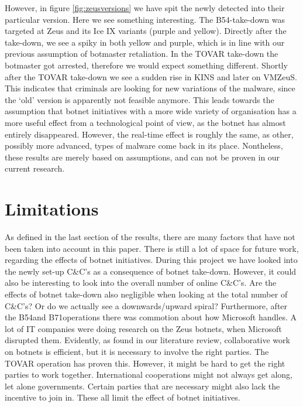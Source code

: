 \documentclass{sig-alternate-br}
\begin{document}
However, in figure \ref{fig:zeusversions} we have spit the newly detected into their particular version. Here we see something interesting. The B54-take-down was targeted at Zeus and its Ice IX variants (purple and yellow). Directly after the take-down, we see a spiky in both yellow and purple, which is in line with our previous assumption of botmaster retaliation. In the TOVAR take-down the botmaster got arrested, therefore we would expect something different. Shortly after the TOVAR take-down we see a sudden rise in KINS and later on VMZeuS. This indicates that criminals are looking for new variations of the malware, since the `old' version is apparently not feasible anymore. This leads towards the assumption that botnet initiatives with a more wide variety of organisation has a more useful effect from a technological point of view, as the botnet has almost entirely disappeared. However, the real-time effect is roughly the same, as other, possibly more advanced, types of malware come back in its place. Nontheless, these results are merely based on assumptions, and can not be proven in our current research. 

\section{Limitations}
As defined in the last section of the results, there are many factors that have not been taken into account in this paper. There is still a lot of space for future work, regarding the effects of botnet initiatives. During this project we have looked into the newly set-up C\&C's as a consequence of botnet take-down. However, it could also be interesting to look into the overall number of online C\&C's. Are the effects of botnet take-down also negligible when looking at the total number of C\&C's? Or do we actually see a downwards/upward spiral?
Furthermore, after the B54\footnotemark and B71\footnotemark operations there was commotion about how Microsoft handles. A lot of IT companies were doing research on the Zeus botnets, when Microsoft disrupted them. Evidently, as found in our literature review, collaborative work on botnets is efficient, but it is necessary to involve the right parties. The TOVAR operation has proven this. However, it might be hard to get the right parties to work together. International cooperations might not always get along, let alone governments. Certain parties that are necessary might also lack the incentive to join in. These all limit the effect of botnet initiatives. 
\end{document}

